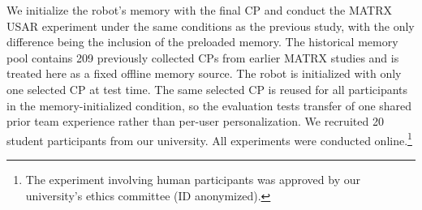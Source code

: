 \documentclass[letterpaper, 10 pt, conference]{ieeeconf}  %
\begin{document}
We initialize the robot's memory with the final CP and conduct the MATRX USAR experiment
under the same conditions as the previous study, with the only difference being the
inclusion of the preloaded memory. The historical memory pool contains 209 previously
collected CPs from earlier MATRX studies and is treated here as a fixed offline memory
source. The robot is initialized with only one selected CP at test time. The same
selected CP is reused for all participants in the memory-initialized condition, so the
evaluation tests transfer of one shared prior team experience rather than per-user
personalization. We recruited 20 student participants from our university. All
experiments were conducted online.\footnote{The experiment involving human participants
was approved by our university's ethics committee (ID anonymized).}
\end{document}
